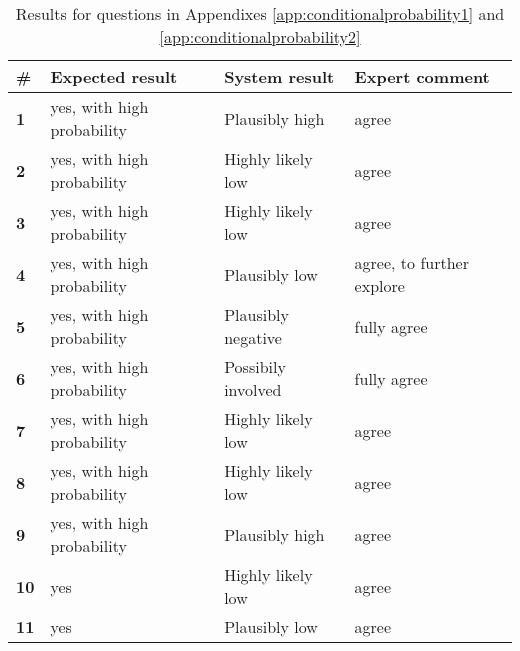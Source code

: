 \begin{table}[h]
	\centering
	\caption{Results for questions in Appendixes  \ref{app:conditionalprobability1} and \ref{app:conditionalprobability2}}
	\begin{tabularx}{\textwidth}{lllX}
		\toprule
		\textbf{\#} & Expected result & System result & Expert comment  \\
		\midrule	
		 \textbf{1} & yes, with high probability & Plausibly high & agree \\
		 \textbf{2} & yes, with high probability & Highly likely low & agree \\
		 \multirow{2}[0]{*}{\textbf{3}} & \multirow{2}[0]{*}{yes, with high probability} & \multirow{2}[0]{*}{Highly likely low} & \multirow{2}[0]{*}{agree} \\
		      &       &       &  \\
		 \textbf{4} & yes, with high probability & Plausibly low & agree, to further explore \\
		 \addlinespace
		 \textbf{5} & yes, with high probability & Plausibly negative & fully agree \\
		 \textbf{6} & yes, with high probability & Possibily involved & fully agree \\
		 \multirow{2}[0]{*}{\textbf{7}} & \multirow{2}[0]{*}{yes, with high probability} & \multirow{2}[0]{*}{Highly likely low} & \multirow{2}[0]{*}{agree} \\
		      &       &       &  \\
		 \textbf{8} & yes, with high probability & Highly likely low & agree \\
		 \multirow{2}[0]{*}{\textbf{9}} & \multirow{2}[0]{*}{yes, with high probability} & \multirow{2}[0]{*}{Plausibly high} & \multirow{2}[0]{*}{agree} \\
		      &       &       &  \\
		 \multirow{2}[0]{*}{\textbf{10}} & \multirow{2}[0]{*}{yes} & \multirow{2}[0]{*}{Highly likely low} & \multirow{2}[0]{*}{agree} \\
	      &       &       &  \\
		\multirow{3}[0]{*}{\textbf{11}} & \multirow{3}[0]{*}{yes} & \multirow{3}[0]{*}{Plausibly low} & \multirow{3}[0]{*}{agree} \\
		      &       &       &  \\
		      &       &       &  \\


\end{tabularx}
\end{table}
